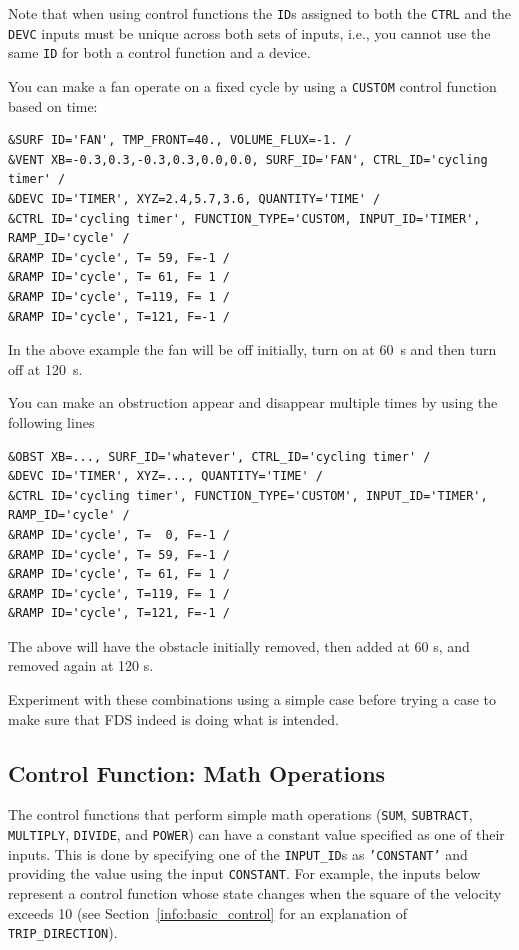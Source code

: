 \documentclass[11pt]{book}
\newcommand{\ct}{\tt\small}
\begin{document}
\begin{warning}
Note that when using control functions the {\ct ID}s assigned to both the
{\ct CTRL} and the {\ct DEVC} inputs must be unique across both sets of inputs, i.e., you cannot use the
same {\ct ID} for both a control function and a device.
\end{warning}

\noindent
You can make a fan operate on a fixed cycle by using a {\ct CUSTOM} control function based on time:

\footnotesize
\begin{verbatim}
&SURF ID='FAN', TMP_FRONT=40., VOLUME_FLUX=-1. /
&VENT XB=-0.3,0.3,-0.3,0.3,0.0,0.0, SURF_ID='FAN', CTRL_ID='cycling timer' /
&DEVC ID='TIMER', XYZ=2.4,5.7,3.6, QUANTITY='TIME' /
&CTRL ID='cycling timer', FUNCTION_TYPE='CUSTOM, INPUT_ID='TIMER', RAMP_ID='cycle' /
&RAMP ID='cycle', T= 59, F=-1 /
&RAMP ID='cycle', T= 61, F= 1 /
&RAMP ID='cycle', T=119, F= 1 /
&RAMP ID='cycle', T=121, F=-1 /
\end{verbatim} \normalsize

\noindent
In the above example the fan will be off initially, turn on at 60~s and then turn off at 120~s.

You can make an obstruction appear and disappear multiple times by using the following lines

\footnotesize
\begin{verbatim}
&OBST XB=..., SURF_ID='whatever', CTRL_ID='cycling timer' /
&DEVC ID='TIMER', XYZ=..., QUANTITY='TIME' /
&CTRL ID='cycling timer', FUNCTION_TYPE='CUSTOM', INPUT_ID='TIMER', RAMP_ID='cycle' /
&RAMP ID='cycle', T=  0, F=-1 /
&RAMP ID='cycle', T= 59, F=-1 /
&RAMP ID='cycle', T= 61, F= 1 /
&RAMP ID='cycle', T=119, F= 1 /
&RAMP ID='cycle', T=121, F=-1 /
\end{verbatim}

\normalsize
\noindent
The above will have the obstacle initially removed, then added at 60 s, and removed again at 120 s.

Experiment with these combinations using a simple
case before trying a case to make sure that FDS indeed is doing what is intended.

\subsection{Control Function: Math Operations }
\label{info:CONTROL_MATH}

The control functions that perform simple math operations ({\ct SUM},  {\ct SUBTRACT},  {\ct MULTIPLY},  {\ct DIVIDE}, and  {\ct POWER}) can have a constant value specified as one of their inputs.  This is done by specifying one of the {\ct INPUT\_ID}s as {\ct 'CONSTANT'} and providing the value using the input {\ct CONSTANT}. For example, the inputs below represent a control function whose state changes when the square of the velocity exceeds 10 (see Section~\ref{info:basic_control} for an explanation of {\ct TRIP\_DIRECTION}).
\end{document}
